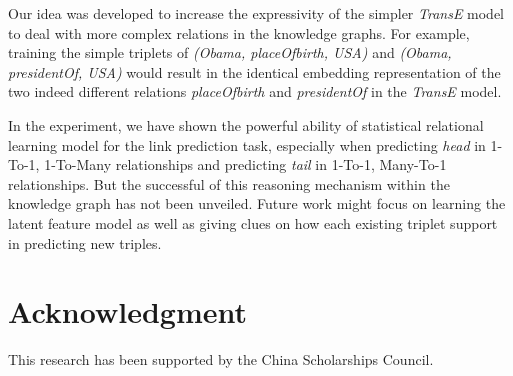 \documentclass[9pt]{sig-alternate-05-2015}
\begin{document}
Our idea was developed to increase the expressivity of the simpler \emph{TransE} model to deal with  more complex relations in the knowledge graphs. For example, training the simple triplets of \emph{(Obama, placeOfbirth, USA)} and \emph{(Obama, presidentOf, USA)} would result in the identical embedding representation of the two indeed different relations \emph{placeOfbirth} and \emph{presidentOf}  in the \emph{TransE} model. 

In the experiment, we have shown the powerful ability of statistical relational learning model for the link prediction task, especially when predicting \emph{head}  in 1-To-1, 1-To-Many relationships  and predicting \emph{tail} in 1-To-1, Many-To-1 relationships. But the successful of this reasoning mechanism within the knowledge graph has not been unveiled. Future work might focus on  learning the latent feature model as well as giving clues on how each existing triplet support in predicting new triples.

\section*{Acknowledgment}
This research has been supported by the China Scholarships Council.





\balancecolumns
\end{document}
